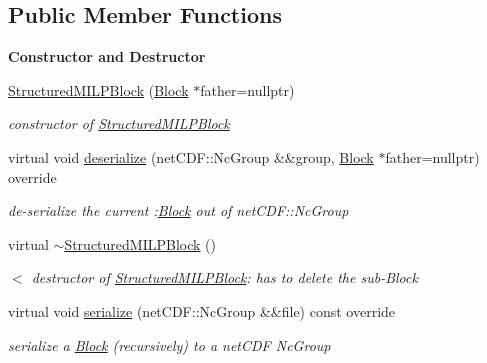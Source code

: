 \subsection*{Public Member Functions}
\begin{Indent}\textbf{ Constructor and Destructor}\par
\begin{DoxyCompactItemize}
\item 
\mbox{\hyperlink{class_s_m_spp__di__unipi__it_1_1_structured_m_i_l_p_block_a5e34856d6824c455c9a72239f12c3ed2}{Structured\+M\+I\+L\+P\+Block}} (\mbox{\hyperlink{class_s_m_spp__di__unipi__it_1_1_block}{Block}} $\ast$father=nullptr)
\begin{DoxyCompactList}\small\item\em constructor of \mbox{\hyperlink{class_s_m_spp__di__unipi__it_1_1_structured_m_i_l_p_block}{Structured\+M\+I\+L\+P\+Block}} \end{DoxyCompactList}\item 
virtual void \mbox{\hyperlink{class_s_m_spp__di__unipi__it_1_1_structured_m_i_l_p_block_a817e3ce47ea40c14517ec16c6b62b814}{deserialize}} (net\+C\+D\+F\+::\+Nc\+Group \&\&group, \mbox{\hyperlink{class_s_m_spp__di__unipi__it_1_1_block}{Block}} $\ast$father=nullptr) override
\begin{DoxyCompactList}\small\item\em de-\/serialize the current \+:\mbox{\hyperlink{class_s_m_spp__di__unipi__it_1_1_block}{Block}} out of net\+C\+D\+F\+::\+Nc\+Group \end{DoxyCompactList}\item 
virtual \mbox{\hyperlink{class_s_m_spp__di__unipi__it_1_1_structured_m_i_l_p_block_a1636fb6f55fc6dd55e23bb08eaeee177}{$\sim$\+Structured\+M\+I\+L\+P\+Block}} ()
\begin{DoxyCompactList}\small\item\em $<$ destructor of \mbox{\hyperlink{class_s_m_spp__di__unipi__it_1_1_structured_m_i_l_p_block}{Structured\+M\+I\+L\+P\+Block}}\+: has to delete the sub-\/\+Block \end{DoxyCompactList}\item 
virtual void \mbox{\hyperlink{class_s_m_spp__di__unipi__it_1_1_structured_m_i_l_p_block_aefb3f33afdab2b6f4aef3f926c10df51}{serialize}} (net\+C\+D\+F\+::\+Nc\+Group \&\&file) const override
\begin{DoxyCompactList}\small\item\em serialize a \mbox{\hyperlink{class_s_m_spp__di__unipi__it_1_1_block}{Block}} (recursively) to a net\+C\+DF Nc\+Group \end{DoxyCompactList}\end{DoxyCompactItemize}
\end{Indent}
